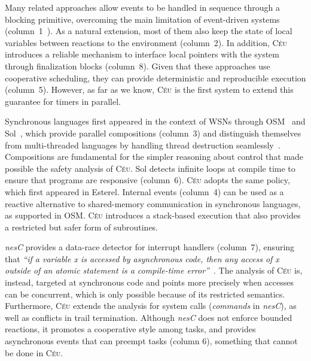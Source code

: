 \documentclass[letterpaper]{sig-alternate}
\newcommand{\CEU}{\textsc{C\'{e}u}\xspace}
\begin{document}
Many related approaches allow events to be handled in sequence through a 
blocking primitive, overcoming the main limitation of event-driven systems 
(column~1~\cite{wsn.protothreads, wsn.ocram, wsn.tinythreads, wsn.flowtalk, 
wsn.sol}).
%
As a natural extension, most of them also keep the state of local variables 
between reactions to the environment (column~2).
In addition, \CEU introduces a reliable mechanism to interface local pointers 
with the system through finalization blocks (column~8).
%
Given that these approaches use cooperative scheduling, they can provide 
deterministic and reproducible execution (column~5).
%
However, as far as we know, \CEU is the first system to extend this guarantee 
for timers in parallel.

Synchronous languages first appeared in the context of WSNs through 
OSM~\cite{wsn.osm} and Sol~\cite{wsn.sol}, which provide parallel compositions 
(column~3) and distinguish themselves from multi-threaded languages by handling 
thread destruction seamlessly~\cite{sync_async.threadsstop,esterel.preemption}.
Compositions are fundamental for the simpler reasoning about control that made 
possible the safety analysis of \CEU.
%
Sol detects infinite loops at compile time to ensure that programs are 
responsive (column~6).
\CEU adopts the same policy, which first appeared in Esterel.
%
Internal events (column~4) can be used as a reactive alternative to 
shared-memory communication in synchronous languages, as supported in OSM.
\CEU introduces a stack-based execution that also provides a restricted but 
safer form of subroutines.

\emph{nesC} provides a data-race detector for interrupt handlers (column~7), 
ensuring that \emph{``if a variable x is accessed by asynchronous code, then 
any access of x outside of an atomic statement is a compile-time 
error''}~\cite{wsn.nesc}.
The analysis of \CEU is, instead, targeted at synchronous code and points more 
precisely when accesses can be concurrent, which is only possible because of 
its restricted semantics.
Furthermore, \CEU extends the analysis for system calls (\emph{commands} in 
\emph{nesC}), as well as conflicts in trail termination.
Although \emph{nesC} does not enforce bounded reactions, it promotes a 
cooperative style among tasks, and provides asynchronous events that can 
preempt tasks (column 6), something that cannot be done in \CEU.
\end{document}
